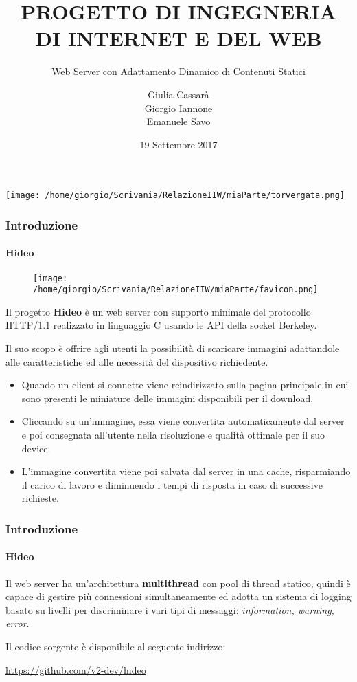 \documentclass{beamer}
\title{\textbf{PROGETTO DI INGEGNERIA DI INTERNET E DEL WEB}}
\subtitle{Web Server con Adattamento Dinamico di Contenuti Statici}
\author{Giulia Cassarà \\ 
 \medskip
Giorgio Iannone
\medskip
\\ Emanuele Savo
}
\date{19 Settembre 2017}
\begin{document}
\begin{frame}
\centerline{\texttt{[image: /home/giorgio/Scrivania/RelazioneIIW/miaParte/torvergata.png]}\hspace{2em}}
\maketitle


\end{frame}


\begin{frame}
\frametitle{Introduzione}
\framesubtitle{Hideo}
\begin{figure}
	\texttt{[image: /home/giorgio/Scrivania/RelazioneIIW/miaParte/favicon.png]}
\end{figure}

Il progetto \textbf{Hideo} è un web server con supporto minimale del protocollo
HTTP/1.1 realizzato in linguaggio C usando le API della socket Berkeley.

\medskip

Il suo scopo è offrire agli utenti la possibilità di scaricare immagini adattandole alle caratteristiche ed alle necessità del
dispositivo richiedente.

\footnotesize
\begin{itemize}
\item Quando un client si connette viene reindirizzato sulla pagina principale in cui sono presenti le miniature delle immagini disponibili per il
download.
\item Cliccando su un’immagine, essa viene convertita automaticamente dal
server e poi consegnata all’utente nella risoluzione e qualità ottimale per il suo
device.
\item L’immagine convertita viene poi salvata dal server in una cache,
risparmiando il carico di lavoro e diminuendo i tempi di risposta in caso di
successive richieste.
\end{itemize}
\normalsize
\end{frame}


\begin{frame}
\frametitle{Introduzione}
\framesubtitle{Hideo}
Il web server ha un’architettura \textbf{multithread} con pool di thread statico, quindi è
capace di gestire più connessioni simultaneamente ed adotta un sistema di logging
basato su livelli per discriminare i vari tipi di messaggi: \textit{information, warning,
error}.


\medskip

Il codice sorgente è disponibile al seguente indirizzo:

\medskip

\setlength{\parindent}{32pt} \href{https://github.com/v2-dev/hideo}{\color{blue}  https://github.com/v2-dev/hideo}


\end{frame}
\end{document}
